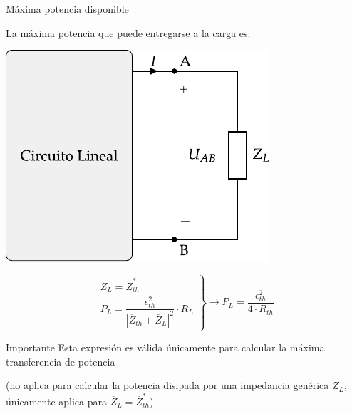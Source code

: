 \documentclass[aspectratio=169, usenames,svgnames,dvipsnames]{beamer}
\begin{document}
\begin{frame}{Máxima potencia disponible}

    \vspace{4mm}
    La \alert{máxima potencia} que puede entregarse a la carga es:

    \vspace{-2mm}
    \begin{minipage}[c]{0.43\linewidth}
        \begin{center}
            \includegraphics[height=0.6\textheight]{../figs/EquivalenteThevenin.pdf}
        \end{center}
    \end{minipage}
    \hfill
    \begin{minipage}[c]{0.52\linewidth}
        \vspace{3mm}
        \begin{equation*}
          \left.
            \begin{matrix}
              \overline{Z}_L = \overline{Z}_{th}^*\\[5pt]
              P_L = \dfrac{\epsilon^2_{th}}{|\overline{Z}_{th} + \overline{Z}_L|^2} \cdot R_L
            \end{matrix} \right\}\rightarrow
          \boxed{P_L = \dfrac{\epsilon^2_{th}}{4 \cdot R_{th}}}
        \end{equation*}

        \begin{block}{Importante}
            Esta expresión es \alert{válida únicamente} para calcular la \alert{máxima transferencia} de potencia
        \end{block}
        
        \vspace{2mm}
        \centering \small{(no aplica para calcular la potencia disipada por una impedancia genérica $\overline{Z}_L$, únicamente aplica para $\overline{Z}_L = \overline{Z}_{th}^*$)}
        
    \end{minipage}
\end{frame}
\end{document}
